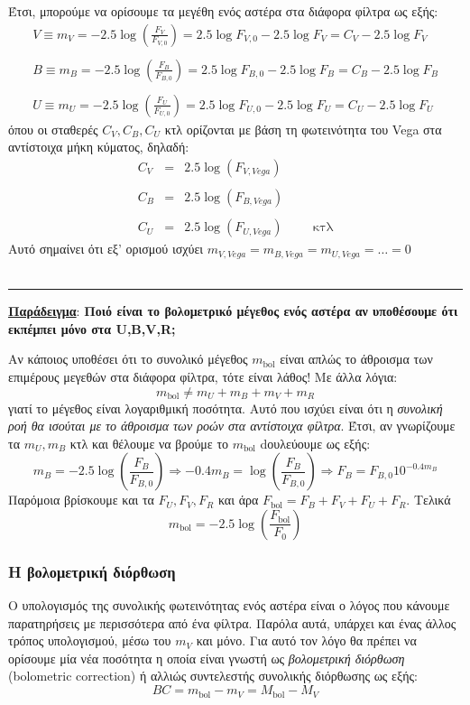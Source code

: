Έτσι, μπορούμε να ορίσουμε τα μεγέθη ενός αστέρα στα διάφορα φίλτρα ως εξής:
\begin{eqnarray*}
    V \equiv m_V = -2.5 \log \left( \frac{F_V}{F_{V,0}} \right) = 2.5 \log F_{V,0} - 2.5 \log F_V = C_V - 2.5 \log F_V \\\\
    B \equiv m_B = -2.5 \log \left( \frac{F_B}{F_{B,0}} \right) = 2.5 \log F_{B,0} - 2.5 \log F_B = C_B - 2.5 \log F_B \\\\
    U \equiv m_U = -2.5 \log \left( \frac{F_U}{F_{U,0}} \right) = 2.5 \log F_{U,0} - 2.5 \log F_U = C_U - 2.5 \log F_U 
\end{eqnarray*}
όπου οι σταθερές $C_V, C_B, C_U$ κτλ ορίζονται με βάση τη φωτεινότητα του Vega στα αντίστοιχα μήκη κύματος, δηλαδή:
\begin{eqnarray*}
    C_V  &=& 2.5 \log(F_{V, Vega}) \\\\
    C_B  &=& 2.5 \log(F_{B, Vega}) \\\\
    C_U  &=& 2.5 \log(F_{U, Vega}) \hspace{1cm} \text{κτλ}
\end{eqnarray*}
Αυτό σημαίνει ότι εξ' ορισμού ισχύει $\boxed{m_{V,Vega} = m_{B,Vega} = m_{U,Vega} = \dots = 0}$
\\\\
\hrule 
\underline{\textbf{Παράδειγμα}}:
\textbf{Ποιό είναι το βολομετρικό μέγεθος ενός αστέρα αν υποθέσουμε ότι εκπέμπει μόνο στα U,B,V,R;}

Αν κάποιος υποθέσει ότι το συνολικό μέγεθος $m_{\text{bol}}$ είναι απλώς το άθροισμα των επιμέρους μεγεθών στα διάφορα φίλτρα, τότε είναι λάθος! Με άλλα λόγια: $$m_{\text{bol}} \neq m_U + m_B + m_V + m_R$$
γιατί το μέγεθος είναι λογαριθμική ποσότητα. Αυτό που ισχύει είναι ότι η \textit{συνολική ροή θα ισούται με το άθροισμα των ροών στα αντίστοιχα φίλτρα}. Έτσι, αν γνωρίζουμε τα $m_U, m_B$ κτλ και θέλουμε να βρούμε το $m_{\text{bol}}$ dουλεύουμε ως εξής:
$$m_B = -2.5 \log \left( \frac{F_B}{F_{B,0}} \right) \Rightarrow -0.4m_B = \log \left( \frac{F_B}{F_{B,0}} \right) \Rightarrow F_B = F_{B,0} 10^{-0.4m_B}$$
Παρόμοια βρίσκουμε και τα $F_U, F_V, F_R$ και άρα $F_{\text{bol}} = F_B+F_V+F_U+F_R$. Τελικά $$m_{\text{bol}} = -2.5 \log \left( \frac{F_{\text{bol}}}{F_0} \right)$$

\subsubsection{Η βολομετρική διόρθωση}
Ο υπολογισμός της συνολικής φωτεινότητας ενός αστέρα είναι ο λόγος που κάνουμε παρατηρήσεις με περισσότερα από ένα φίλτρα. Παρόλα αυτά, υπάρχει και ένας άλλος τρόπος υπολογισμού, μέσω του $m_V$ και μόνο. Για αυτό τον λόγο θα πρέπει να ορίσουμε μία νέα ποσότητα η οποία είναι γνωστή ως \textit{βολομετρική διόρθωση} (bolometric correction) ή αλλιώς συντελεστής συνολικής διόρθωσης ως εξής:
\begin{equation}
    \boxed{BC = m_{\text{bol}} - m_V = M_{\text{bol}} - M_V}
\end{equation}

